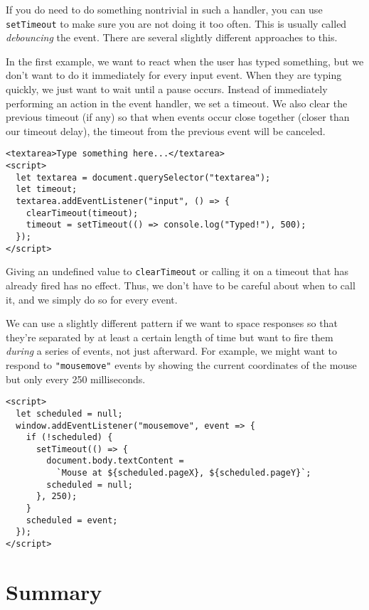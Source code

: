 If you do need to do something nontrivial in such a handler, you can use \lstinline`setTimeout` to make sure you are not doing it too often. This is usually called \emph{debouncing} the event. There are several slightly different approaches to this.

In the first example, we want to react when the user has typed something, but we don't want to do it immediately for every input event. When they are typing quickly, we just want to wait until a pause occurs. Instead of immediately performing an action in the event handler, we set a timeout. We also clear the previous timeout (if any) so that when events occur close together (closer than our timeout delay), the timeout from the previous event will be canceled.

\begin{lstlisting}
<textarea>Type something here...</textarea>
<script>
  let textarea = document.querySelector("textarea");
  let timeout;
  textarea.addEventListener("input", () => {
    clearTimeout(timeout);
    timeout = setTimeout(() => console.log("Typed!"), 500);
  });
</script>
\end{lstlisting}
\noindent{}

Giving an undefined value to \lstinline`clearTimeout` or calling it on a timeout that has already fired has no effect. Thus, we don't have to be careful about when to call it, and we simply do so for every event.

We can use a slightly different pattern if we want to space responses so that they're separated by at least a certain length of time but want to fire them \emph{during} a series of events, not just afterward. For example, we might want to respond to \lstinline`"mousemove"` events by showing the current coordinates of the mouse but only every 250 milliseconds.

\begin{lstlisting}
<script>
  let scheduled = null;
  window.addEventListener("mousemove", event => {
    if (!scheduled) {
      setTimeout(() => {
        document.body.textContent =
          `Mouse at ${scheduled.pageX}, ${scheduled.pageY}`;
        scheduled = null;
      }, 250);
    }
    scheduled = event;
  });
</script>
\end{lstlisting}
\noindent

\section{Summary}

